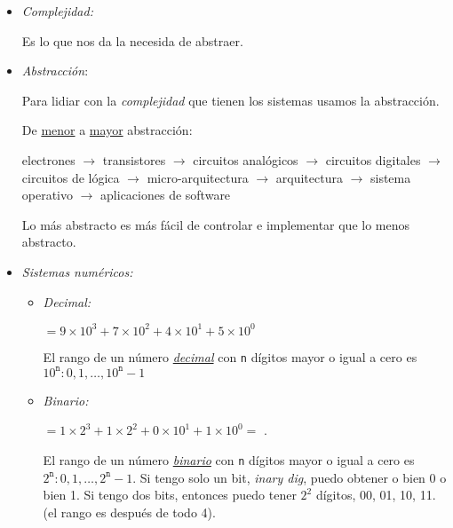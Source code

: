 \def\iconTeoriaUno{\tiny\faIcon{laptop}}
\def\iconTeoriaDos{\tiny\faIcon{calculator}}
\def\iconTeoriaTres{\tiny\faIcon{laptop-code}}

\begin{itemize}[label=\iconTeoriaUno]
  \item  \textit{Complejidad:}\par
        Es lo que nos da la necesida de abstraer.

  \item \textit{Abstracción}: \par
        Para lidiar con la \textit{complejidad} que tienen los sistemas usamos la abstracción.\par
        De \underline{menor} a \underline{mayor} abstracción:
        \begin{center}
          electrones
          $\to$
          transistores
          $\to$
          circuitos analógicos
          $\to$
          circuitos digitales
          $\to$
          circuitos de lógica
          $\to$
          micro-arquitectura
          $\to$
          arquitectura
          $\to$
          sistema operativo
          $\to$
          aplicaciones de software
        \end{center}

        Lo más abstracto es más fácil de controlar e implementar que lo menos abstracto.

  \item \textit{Sistemas numéricos:}
        \begin{itemize}[label=\iconTeoriaDos]
          \item \textit{Decimal:}
                \begin{center}
                   $ = 9 \times 10^3 + 7 \times 10^2 + 4 \times 10^1 + 5 \times 10^0$
                \end{center}
                El rango de un número \underline{\textit{decimal}} con \texttt{n} dígitos mayor o igual a cero es $10^{\texttt{n}}: 0,1, \dots, 10^{\texttt{n}} - 1$

          \item \textit{Binario:}
                \begin{center}
                   $= 1 \times 2^3 + 1 \times 2^2 + 0 \times 10^1 + 1 \times 10^0 =$ .
                \end{center}
                El rango de un número \underline{\textit{binario}} con \texttt{n} dígitos mayor o igual a cero es $2^{\texttt{n}}: 0,1, \dots, 2^{\texttt{n}} - 1$.
                Si tengo solo un bit, \textit{inary dig}, puedo obtener o bien 0 o bien 1. Si tengo dos bits, entonces
                puedo tener $2^2$ dígitos, 00, 01, 10, 11. (el rango es después de todo 4).


\end{itemize}
\end{itemize}
